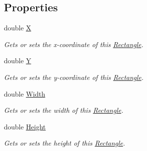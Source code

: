 \subsection*{Properties}
\begin{DoxyCompactItemize}
\item 
double \mbox{\hyperlink{struct_test_project_1_1_task_library_1_1_tasks_1_1_lesson2_1_1_models_1_1_rectangle_ac4202dbf33308e10ec1dc8c86110af75}{X}}
\begin{DoxyCompactList}\small\item\em Gets or sets the x-\/coordinate of this \mbox{\hyperlink{struct_test_project_1_1_task_library_1_1_tasks_1_1_lesson2_1_1_models_1_1_rectangle}{Rectangle}}. \end{DoxyCompactList}\item 
double \mbox{\hyperlink{struct_test_project_1_1_task_library_1_1_tasks_1_1_lesson2_1_1_models_1_1_rectangle_a0f43578146610d7c2f80562ac8a65c18}{Y}}
\begin{DoxyCompactList}\small\item\em Gets or sets the y-\/coordinate of this \mbox{\hyperlink{struct_test_project_1_1_task_library_1_1_tasks_1_1_lesson2_1_1_models_1_1_rectangle}{Rectangle}}. \end{DoxyCompactList}\item 
double \mbox{\hyperlink{struct_test_project_1_1_task_library_1_1_tasks_1_1_lesson2_1_1_models_1_1_rectangle_a376d1d0e9120b91de0023bef0a1211ea}{Width}}
\begin{DoxyCompactList}\small\item\em Gets or sets the width of this \mbox{\hyperlink{struct_test_project_1_1_task_library_1_1_tasks_1_1_lesson2_1_1_models_1_1_rectangle}{Rectangle}}. \end{DoxyCompactList}\item 
double \mbox{\hyperlink{struct_test_project_1_1_task_library_1_1_tasks_1_1_lesson2_1_1_models_1_1_rectangle_a579437d2c197b3dd47b599b0717eb244}{Height}}
\begin{DoxyCompactList}\small\item\em Gets or sets the height of this \mbox{\hyperlink{struct_test_project_1_1_task_library_1_1_tasks_1_1_lesson2_1_1_models_1_1_rectangle}{Rectangle}}. \end{DoxyCompactList}\end{DoxyCompactItemize}


